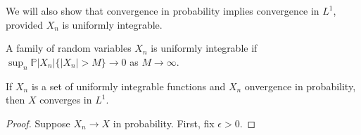     We will also show that convergence in probability implies convergence in $L^1$, provided 
    $X_n$ is uniformly integrable. 

    \begin{definition}
        A family of random variables $X_n$ is uniformly integrable if 
        $\sup_n \mathbb P|X_n|\{|X_n| > M\} \to 0$ as $M \to \infty$. 
    \end{definition}

    \begin{theorem}
        If $X_n$ is a set of uniformly integrable functions 
        and $X_n$ onvergence in probability, then $X$ converges in $L^1$.
    \end{theorem}
    \begin{proof}
        Suppose $X_n \to X$ in probability. First, fix $\epsilon > 0$. 
        

    \end{proof}